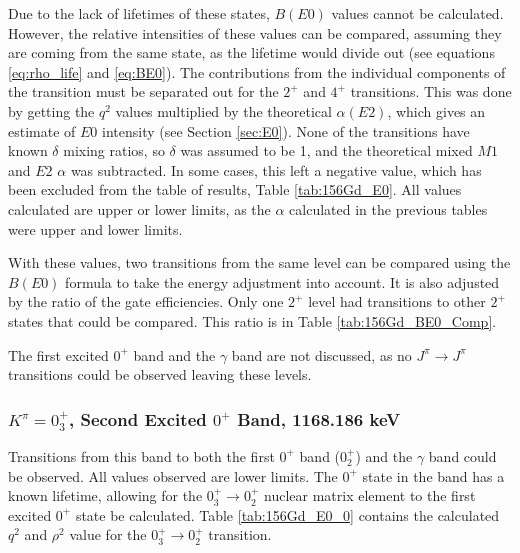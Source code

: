 \afterpage{\clearpage}

Due to the lack of lifetimes of these states, $B(E0)$ values cannot be calculated. However, the relative intensities of these values can be compared, assuming they are coming from the same state, as the lifetime would divide out (see equations \ref{eq:rho_life} and \ref{eq:BE0}). The contributions from the individual components of the transition must be separated out for the $2^+$ and $4^+$ transitions. This was done by getting the $q^2$ values multiplied by the theoretical $\alpha(E2)$, which gives an estimate of $E0$ intensity (see Section \ref{sec:E0}). None of the transitions have known $\delta$ mixing ratios, so $\delta$ was assumed to be 1, and the theoretical mixed $M1$ and $E2$ $\alpha$ was subtracted. In some cases, this left a negative value, which has been excluded from the table of results, Table \ref{tab:156Gd_E0}. All values calculated are upper or lower limits, as the $\alpha$ calculated in the previous tables were upper and lower limits. 

With these values, two transitions from the same level can be compared using the $B(E0)$ formula to take the energy adjustment into account. It is also adjusted by the ratio of the gate efficiencies. Only one $2^+$ level had transitions to other $2^+$ states that could be compared. This ratio is in Table \ref{tab:156Gd_BE0_Comp}.

The first excited $0^+$ band and the $\gamma$ band are not discussed, as no $J^{\pi}\rightarrow J^{\pi}$ transitions could be observed leaving these levels.

\afterpage{}

\afterpage{}

\subsubsection{$K^{\pi}=0^+_3$, Second Excited $0^+$ Band, 1168.186 keV}

Transitions from this band to both the first $0^+$ band ($0^+_{2}$) and the $\gamma$ band could be observed. All values observed are lower limits. The $0^+$ state in the band has a known lifetime, allowing for the $0^+_3\rightarrow 0^+_2$ nuclear matrix element to the first excited $0^+$ state be calculated\citep{aprahamian18:_156gd}. Table \ref{tab:156Gd_E0_0} contains the calculated $q^2$ and $\rho^2$ value for the $0^+_3\rightarrow0^+_2$ transition.

